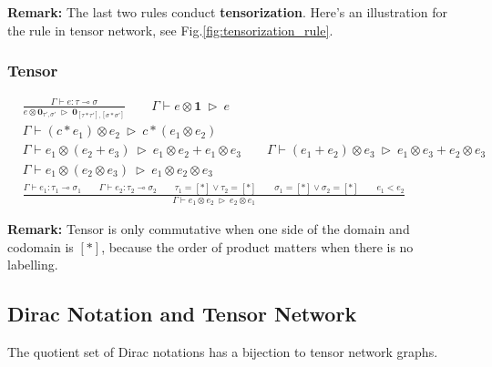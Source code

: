 \textbf{Remark: } The last two rules conduct \textbf{tensorization}. Here's an illustration for the rule in tensor network, see Fig.\ref{fig:tensorization_rule}.


\subsubsection*{Tensor}
\begin{align*}
  & \frac{\Gamma \vdash e : \tau \multimap \sigma}{e \otimes \textbf{0}_{\tau', \sigma'} \ \triangleright\ \textbf{0}_{[\tau * \tau'], [\sigma * \sigma']}}
  \qquad \Gamma \vdash e \otimes \mathbf{1} \ \triangleright\ e\\
  & \Gamma \vdash (c * e_1) \otimes e_2 \ \triangleright\ c * (e_1 \otimes e_2)\\
  & \Gamma \vdash e_1 \otimes (e_2 + e_3) \ \triangleright\ e_1 \otimes e_2 + e_1 \otimes e_3
  \qquad 
  \Gamma \vdash (e_1 + e_2) \otimes e_3 \ \triangleright\ e_1 \otimes e_3 + e_2 \otimes e_3\\
  & \Gamma \vdash e_1 \otimes (e_2 \otimes e_3) \ \triangleright\ e_1 \otimes e_2 \otimes e_3\\
  & \frac{\Gamma \vdash e_1 : \tau_1 \multimap \sigma_1 \qquad \Gamma \vdash e_2 : \tau_2 \multimap \sigma_2 \qquad \tau_1 = [*] \vee \tau_2 = [*]\qquad \sigma_1 = [*] \vee \sigma_2 = [*] \qquad e_1 < e_2}{\Gamma \vdash e_1 \otimes e_2 \ \triangleright\ e_2 \otimes e_1}
\end{align*}

\textbf{Remark: } Tensor is only commutative when one side of the domain and codomain is $[*]$, because the order of product matters when there is no labelling.


\subsection{Dirac Notation and Tensor Network}


\begin{claim}
  The quotient set of Dirac notations has a bijection to tensor network graphs.
\end{claim}


